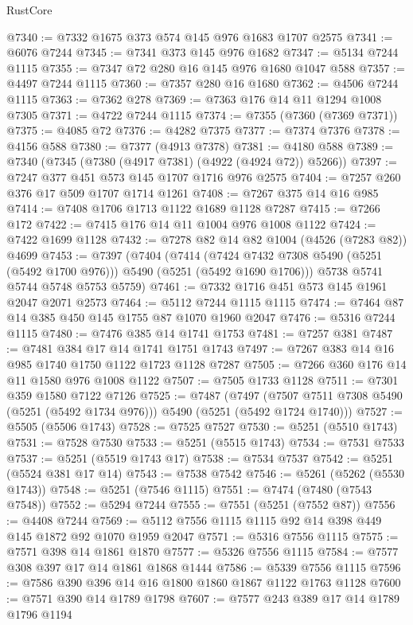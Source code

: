 \begin{lexlean}{RustCore}
\begin{coremodule}
@7340 := @7332 @1675 @373 @574 @145 @976 @1683 @1707 @2575
@7341 := @6076 @7244
@7345 := @7341 @373 @145 @976 @1682
@7347 := @5134 @7244 @1115
@7355 := @7347 @72 @280 @16 @145 @976 @1680 @1047 @588
@7357 := @4497 @7244 @1115
@7360 := @7357 @280 @16 @1680
@7362 := @4506 @7244 @1115
@7363 := @7362 @278
@7369 := @7363 @176 @14 @11 @1294 @1008 @7305
@7371 := @4722 @7244 @1115
@7374 := @7355 (@7360 (@7369 @7371))
@7375 := @4085 @72
@7376 := @4282 @7375
@7377 := @7374 @7376
@7378 := @4156 @588
@7380 := @7377 (@4913 @7378)
@7381 := @4180 @588
@7389 := @7340 (@7345 (@7380 (@4917 @7381) (@4922 (@4924 @72)) @5266))
@7397 := @7247 @377 @451 @573 @145 @1707 @1716 @976 @2575
@7404 := @7257 @260 @376 @17 @509 @1707 @1714 @1261
@7408 := @7267 @375 @14 @16 @985
@7414 := @7408 @1706 @1713 @1122 @1689 @1128 @7287
@7415 := @7266 @172
@7422 := @7415 @176 @14 @11 @1004 @976 @1008 @1122
@7424 := @7422 @1699 @1128
@7432 := @7278 @82 @14 @82 @1004 (@4526 (@7283 @82)) @4699
@7453 := @7397
    (@7404
      (@7414 (@7424 @7432 @7308 @5490 (@5251 (@5492 @1700 @976))) @5490 (@5251 (@5492 @1690 @1706)))
      @5738
      @5741
      @5744
      @5748
      @5753
      @5759)
@7461 := @7332 @1716 @451 @573 @145 @1961 @2047 @2071 @2573
@7464 := @5112 @7244 @1115 @1115
@7474 := @7464 @87 @14 @385 @450 @145 @1755 @87 @1070 @1960 @2047
@7476 := @5316 @7244 @1115
@7480 := @7476 @385 @14 @1741 @1753
@7481 := @7257 @381
@7487 := @7481 @384 @17 @14 @1741 @1751 @1743
@7497 := @7267 @383 @14 @16 @985 @1740 @1750 @1122 @1723 @1128 @7287
@7505 := @7266 @360 @176 @14 @11 @1580 @976 @1008 @1122
@7507 := @7505 @1733 @1128
@7511 := @7301 @359 @1580 @7122 @7126
@7525 := @7487
    (@7497 (@7507 @7511 @7308 @5490 (@5251 (@5492 @1734 @976))) @5490 (@5251 (@5492 @1724 @1740)))
@7527 := @5505 (@5506 @1743)
@7528 := @7525 @7527
@7530 := @5251 (@5510 @1743)
@7531 := @7528 @7530
@7533 := @5251 (@5515 @1743)
@7534 := @7531 @7533
@7537 := @5251 (@5519 @1743 @17)
@7538 := @7534 @7537
@7542 := @5251 (@5524 @381 @17 @14)
@7543 := @7538 @7542
@7546 := @5261 (@5262 (@5530 @1743))
@7548 := @5251 (@7546 @1115)
@7551 := @7474 (@7480 (@7543 @7548))
@7552 := @5294 @7244
@7555 := @7551 (@5251 (@7552 @87))
@7556 := @4408 @7244
@7569 := @5112 @7556 @1115 @1115 @92 @14 @398 @449 @145 @1872 @92 @1070 @1959 @2047
@7571 := @5316 @7556 @1115
@7575 := @7571 @398 @14 @1861 @1870
@7577 := @5326 @7556 @1115
@7584 := @7577 @308 @397 @17 @14 @1861 @1868 @1444
@7586 := @5339 @7556 @1115
@7596 := @7586 @390 @396 @14 @16 @1800 @1860 @1867 @1122 @1763 @1128
@7600 := @7571 @390 @14 @1789 @1798
@7607 := @7577 @243 @389 @17 @14 @1789 @1796 @1194

\end{coremodule}
\end{lexlean}
